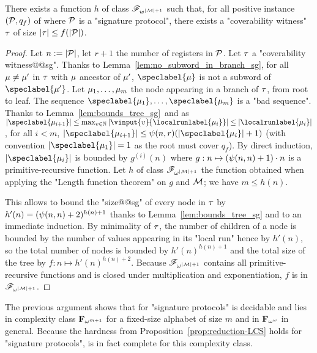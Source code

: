 \begin{proposition}
\label{prop:bounded_witness_sg}
There exists a function $h$ of class $\mathscr{F}_{w^{|\mathcal{M}|+1}}$ such that, 
for all positive instance $(\mathcal{P}, q_f)$ of \COVER where $\mathcal{P}$ is a "signature protocol", there exists a "coverability witness" $\tau$ of size $|\tau| \leq f(|\mathcal{P}|)$.
\end{proposition}
\begin{proof}
Let $n := |\mathcal{P}|$, let $r+1$ the number of registers in $\mathcal{P}$. 
Let $\tau$ a "coverability witness@@sg". Thanks to Lemma~\ref{lem:no_subword_in_branch_sg}, for all $\mu \ne \mu'$ in 
$\tau$ with $\mu$ ancestor of $\mu'$, $\speclabel{\node}$ is not a subword of $\speclabel{\node'}$.  Let $\mu_1, \dots, \mu_m$ the node appearing in a branch of $\tau$, from root to leaf. The sequence $\speclabel{\node_1}, \dots, \speclabel{\node_m}$ is a "bad sequence".
Thanks to Lemma~\ref{lem:bounds_tree_sg}\ and as $\size{\speclabel{\node_{i+1}}} \leq \max_{v \in \nats} \size{\vinput{v}{\localrunlabel{\node_i}}} \leq \size{\localrunlabel{\node_i}}$, for all $i<m$, $\size{\speclabel{\node_{i+1}}} \leq \towerfun(n,r) (\size{\speclabel{\node_{i}}} +1)$ (with convention $\size{\speclabel{\node_1}} = 1$ as the root must cover $q_f$). By direct induction, $\size{\speclabel{\node_i}}$ is bounded by $g^{(i)}(n)$ where $g: n \mapsto (\psi(n,n)+1) \cdot n$ is a primitive-recursive function. Let $h$ of class $\mathscr{F}_{\omega^{|\mathcal{M}|+1}}$ the function obtained when applying the "Length function theorem" on $g$ and $\mathcal{M}$; we have $m \leq h(n)$. 

This allows to bound the "size@@sg" of every node in $\tau$ by $h'(n) = (\psi(n,n)+2)^{h(n) + 1}$ thanks to Lemma~\ref{lem:bounds_tree_sg} and to an immediate induction. 
By minimality of $\tau$, the number of children of a node is bounded by the number of values appearing in its "local run" hence by $h'(n)$, so the total number of nodes is bounded by $h'(n)^{h(n)+1}$ and the total size of the tree by $f:n \mapsto h'(n)^{h(n)+2}$. Because $\mathscr{F}_{\omega^{|\mathcal{M}|+1}}$ contains all primitive-recursive functions and is closed under multiplication and exponentiation, $f$ is in $\mathscr{F}_{\omega^{|\mathcal{M}|+1}}$.
\end{proof}

The previous argument shows that \COVER for "signature protocols" is decidable and lies in complexity class $\mathbf{F}_{\omega^{m+1}}$ for a fixed-size alphabet of size $m$ and in $\mathbf{F}_{\omega^\omega}$ in general. Because the hardness from Proposition~\ref{prop:reduction-LCS} holds for "signature protocols", \COVER is in fact complete for this complexity class.

